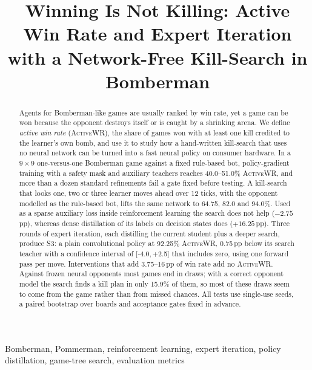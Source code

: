 \documentclass[conference]{IEEEtran}
\newcommand{\awr}{\textsc{ActiveWR}}
\newcommand{\pp}{\,pp}
\newcommand{\ci}[2]{[#1,\,#2]}
\begin{document}
\title{Winning Is Not Killing: Active Win Rate and Expert Iteration with a Network-Free Kill-Search in Bomberman}

\author{
}

\maketitle

\begin{abstract}
Agents for Bomberman-like games are usually ranked by win rate, yet a game can be won because the opponent destroys itself or is caught by a shrinking arena. We define \emph{active win rate} (\awr{}), the share of games won with at least one kill credited to the learner's own bomb, and use it to study how a hand-written kill-search that uses no neural network can be turned into a fast neural policy on consumer hardware. In a $9\times9$ one-versus-one Bomberman game against a fixed rule-based bot, policy-gradient training with a safety mask and auxiliary teachers reaches 40.0--51.0\% \awr{}, and more than a dozen standard refinements fail a gate fixed before testing. A kill-search that looks one, two or three learner moves ahead over 12 ticks, with the opponent modelled as the rule-based bot, lifts the same network to 64.75, 82.0 and 94.0\%. Used as a sparse auxiliary loss inside reinforcement learning the search does not help ($-2.75$\pp{}), whereas dense distillation of its labels on decision states does ($+16.25$\pp{}). Three rounds of expert iteration, each distilling the current student plus a deeper search, produce S3: a plain convolutional policy at 92.25\% \awr{}, 0.75\pp{} below its search teacher with a confidence interval of \ci{-4.0}{+2.5} that includes zero, using one forward pass per move. Interventions that add 3.75--16\pp{} of win rate add no \awr{}. Against frozen neural opponents most games end in draws; with a correct opponent model the search finds a kill plan in only 15.9\% of them, so most of these draws seem to come from the game rather than from missed chances. All tests use single-use seeds, a paired bootstrap over boards and acceptance gates fixed in advance.
\end{abstract}

\begin{IEEEkeywords}
Bomberman, Pommerman, reinforcement learning, expert iteration, policy distillation, game-tree search, evaluation metrics
\end{IEEEkeywords}
\end{document}
